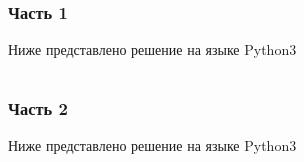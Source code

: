 \codeExample

\subsubsection*{Часть 1}

Ниже представлено решение на языке Python3

\inputminted[fontsize=\footnotesize, linenos]{python}{2nd_tour/ies/task_04/source_1.py}

\subsubsection*{Часть 2}

Ниже представлено решение на языке Python3

\inputminted[fontsize=\footnotesize, linenos]{python}{2nd_tour/ies/task_04/source_2.py}
